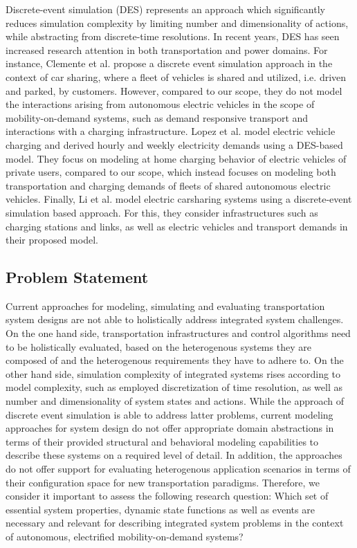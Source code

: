 \documentclass[graybox]{svmult}
\begin{document}
Discrete-event simulation (DES) represents an approach which significantly reduces simulation complexity by limiting number and dimensionality of actions, while abstracting from discrete-time resolutions. In recent years, DES has seen increased research attention in both transportation \cite{clemente2013discrete, fanti2017fleet} and power \cite{lebeau2013implementing, ferro2019predictive, lopez2021modeling} domains. For instance, Clemente et al. \cite{clemente2013discrete} propose a discrete event simulation approach in the context of car sharing, where a fleet of vehicles is shared and utilized, i.e. driven and parked, by customers. However, compared to our scope, they do not model the interactions arising from autonomous electric vehicles in the scope of mobility-on-demand systems, such as demand responsive transport and interactions with a charging infrastructure. Lopez et al. \cite{lopez2021modeling} model electric vehicle charging and derived hourly and weekly electricity demands using a DES-based model. They focus on modeling at home charging behavior of electric vehicles of private users, compared to our scope, which instead focuses on modeling both transportation and charging demands of fleets of shared autonomous electric vehicles. Finally, Li et al. \cite{li2021simulation} model electric carsharing systems using a discrete-event simulation based approach. For this, they consider infrastructures such as charging stations and links, as well as electric vehicles and transport demands in their proposed model.

\subsection{Problem Statement}

Current approaches for modeling, simulating and evaluating transportation system designs are not able to holistically address integrated system challenges. On the one hand side, transportation infrastructures and control algorithms need to be holistically evaluated, based on the heterogenous systems they are composed of and the heterogenous requirements they have to adhere to. On the other hand side, simulation complexity of integrated systems rises according to model complexity, such as employed discretization of time resolution, as well as number and dimensionality of system states and actions. While the approach of discrete event simulation is able to address latter problems, current modeling approaches for system design do not offer appropriate domain abstractions in terms of their provided structural and behavioral modeling capabilities to describe these systems on a required level of detail. In addition, the approaches do not offer support for evaluating heterogenous application scenarios in terms of their configuration space for new transportation paradigms. Therefore, we consider it important to assess the following research question: Which set of essential system properties, dynamic state functions as well as events are necessary and relevant for describing integrated system problems in the context of autonomous, electrified mobility-on-demand systems?
\end{document}
